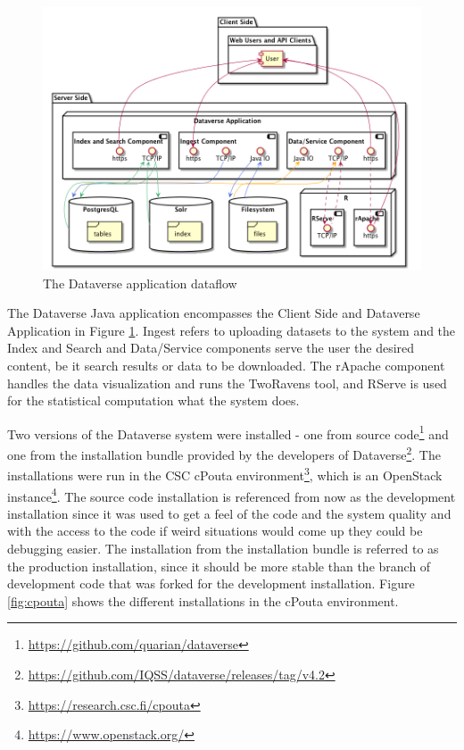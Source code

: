 \begin{figure}
    \begin{centering}
        \includegraphics[width=\textwidth]{images/dataflow}
    \end{centering}
    \caption[The Dataverse application dataflow]{The Dataverse application dataflow}
    \label{fig:dataflow}
\end{figure}

The Dataverse Java application encompasses the Client Side and Dataverse
Application in Figure \ref{fig:dataflow}. Ingest refers to uploading datasets
to the system and the Index and Search and Data/Service components serve the
user the desired content, be it search results or data to be downloaded. The
rApache component handles the data visualization and runs the TwoRavens tool,
and RServe is used for the statistical computation what the system does.

Two versions of the Dataverse system were installed - one from source
code\footnote{\url{https://github.com/quarian/dataverse}} and one from the
installation bundle provided by the developers of
Dataverse\footnote{\url{https://github.com/IQSS/dataverse/releases/tag/v4.2}}.
The installations were run in the CSC cPouta
environment\footnote{\url{https://research.csc.fi/cpouta}}, which is an
OpenStack instance\footnote{\url{https://www.openstack.org/}}. The source code
installation is referenced from now as the development installation since it
was used to get a feel of the code and the system quality and with the access
to the code if weird situations would come up they could be debugging easier.
The installation from the installation bundle is referred to as the production
installation, since it should be more stable than the branch of development
code that was forked for the development installation. Figure
\ref{fig:cpouta} shows the different installations in the cPouta environment.

